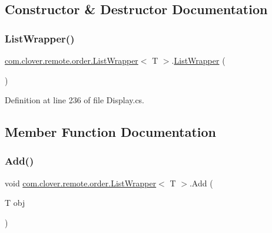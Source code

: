 \subsection{Constructor \& Destructor Documentation}
\mbox{\label{classcom_1_1clover_1_1remote_1_1order_1_1_list_wrapper_aae2fadf9a7c952b449fd3637a2adca7e}} 
\subsubsection{\texorpdfstring{List\+Wrapper()}{ListWrapper()}}
{\footnotesize\ttfamily \hyperlink{classcom_1_1clover_1_1remote_1_1order_1_1_list_wrapper}{com.\+clover.\+remote.\+order.\+List\+Wrapper}$<$ T $>$.\hyperlink{classcom_1_1clover_1_1remote_1_1order_1_1_list_wrapper}{List\+Wrapper} (\begin{DoxyParamCaption}{ }\end{DoxyParamCaption})}



Definition at line 236 of file Display.\+cs.



\subsection{Member Function Documentation}
\mbox{\label{classcom_1_1clover_1_1remote_1_1order_1_1_list_wrapper_ad7beebf272746d39d91cbdff4027a24c}} 
\subsubsection{\texorpdfstring{Add()}{Add()}}
{\footnotesize\ttfamily void \hyperlink{classcom_1_1clover_1_1remote_1_1order_1_1_list_wrapper}{com.\+clover.\+remote.\+order.\+List\+Wrapper}$<$ T $>$.Add (\begin{DoxyParamCaption}\item[{T}]{obj }\end{DoxyParamCaption})}



